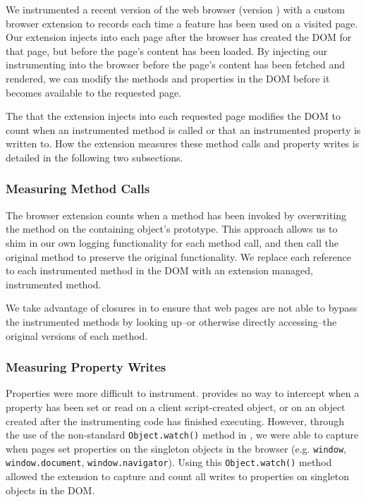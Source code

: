 We instrumented a recent version of the \FF web
browser (version \FFversion) with a custom browser extension to
records each time a \JS feature has been used on a visited page.  Our extension
injects \JS into each page after the browser has created the DOM for that page,
but before the page's content has been loaded. By injecting our instrumenting
\JS into the browser before the page's content has been fetched and rendered, we
can modify the methods and properties in the DOM before it becomes
available to the requested page.

The \JS that the extension injects into each requested page modifies
the DOM to count when an instrumented method is called or that an
instrumented property is written to.  How the extension measures these method calls
and property writes is detailed in the following two subsections.



\subsubsection{Measuring Method Calls}
The browser extension counts when a method has been invoked by overwriting the method on
the containing object's prototype.  This approach allows us to shim in our own
logging functionality for each method call, and then call the original method
to preserve the original functionality.  We replace each reference to each
instrumented method in the DOM with an extension managed, instrumented
method.

We take advantage of closures in \JS to ensure that web
pages are not able to bypass the instrumented methods by
looking up--or otherwise directly accessing--the original versions of each
method.


\subsubsection{Measuring Property Writes}
Properties were more difficult to instrument.  \JS provides no way to
intercept when a property has been set or read on a client script-created object,
or on an object created after the instrumenting code has finished executing.
However, through the use of the non-standard
\texttt{Object.watch()}\cite{mozillaobjectwatch} method in
\FF, we were able to capture when pages set properties on
the singleton objects in the browser (e.g. \texttt{window},
\texttt{window.document}, \texttt{window.navigator}).  Using this
\texttt{Object.watch()} method allowed the extension to capture and count
all writes to properties on singleton objects in the DOM.

